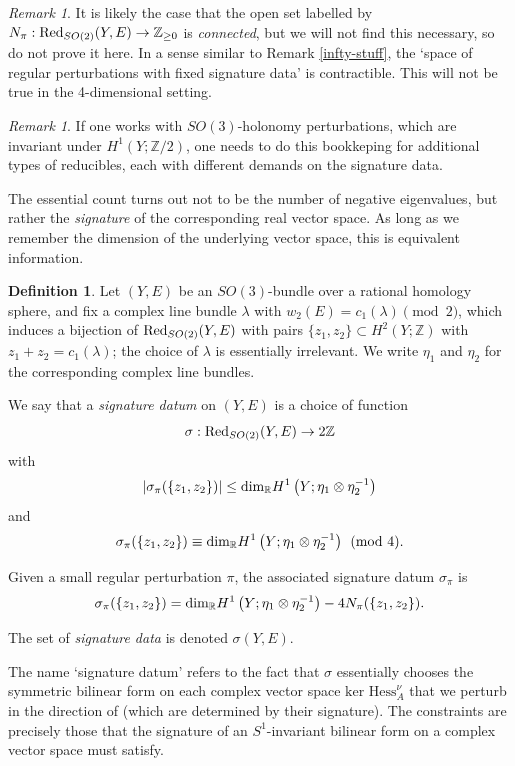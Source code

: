 \documentclass{memo-l}
\theoremstyle{definition}
\newtheorem{definition}[theorem]{Definition}
\theoremstyle{remark}
\newtheorem{remark}[theorem]{Remark}
\numberwithin{section}{chapter}
\numberwithin{equation}{chapter}
\begin{document}
\begin{remark}It is likely the case that the open set labelled by $N_\pi: \textup{Red}_{SO(2)}(Y,E) \to \mathbb Z_{\geq 0}$ is \textit{connected}, but we will not find this necessary, so do not prove it here. In a sense similar to Remark \ref{infty-stuff}, the `space of regular perturbations with fixed signature data' is contractible. This will not be true in the 4-dimensional setting.
\end{remark}

\begin{remark}If one works with $SO(3)$-holonomy perturbations, which are invariant under $H^1(Y;\mathbb Z/2)$, one needs to do this bookkeping for additional types of reducibles, each with different demands on the signature data.
\end{remark}

The essential count turns out not to be the number of negative eigenvalues, but rather the \emph{signature} of the corresponding real vector space. As long as we remember the dimension of the underlying vector space, this is equivalent information.

\begin{definition}\label{sigdata}Let $(Y, E)$ be an $SO(3)$-bundle over a rational homology sphere, and fix a complex line bundle $\lambda$ with $w_2(E) = c_1(\lambda) \pmod 2$, which induces a bijection of $\textup{Red}_{SO(2)}(Y,E)$ with pairs $\{z_1, z_2 \}\subset H^2(Y; \mathbb Z)$ with $z_1 + z_2 = c_1(\lambda)$; the choice of $\lambda$ is essentially irrelevant. We write $\eta_1$ and $\eta_2$ for the corresponding complex line bundles.

We say that a \textit{signature datum} on $(Y, E)$ is a choice of function 
$$\sigma: \textup{Red}_{SO(2)}(Y,E) \to 2\mathbb Z$$ 
with 
$$|\sigma_\pi(\{z_1, z_2\})| \leq \textup{dim}_{\mathbb R} H^1\left(Y; \eta_1 \otimes \eta_2^{-1}\right)$$ 
and 
$$\sigma_\pi(\{z_1, z_2\}) \equiv \textup{dim}_{\mathbb R} H^1\left(Y; \eta_1 \otimes \eta_2^{-1}\right) \pmod 4.$$

Given a small regular perturbation $\pi$, the associated signature datum $\sigma_\pi$ is 
$$\sigma_\pi(\{z_1, z_2\}) = \textup{dim}_{\mathbb R} H^1\left(Y; \eta_1 \otimes \eta_2^{-1}\right) - 4N_\pi(\{z_1, z_2\}).$$

The set of \textit{signature data} is denoted $\sigma(Y, E)$.
\end{definition}

The name `signature datum' refers to the fact that $\sigma$ essentially chooses the symmetric bilinear form on each complex vector space $\text{ker } \text{Hess}^\nu_A$ that we perturb in the direction of (which are determined by their signature). The constraints are precisely those that the signature of an $S^1$-invariant bilinear form on a complex vector space must satisfy.
\end{document}
